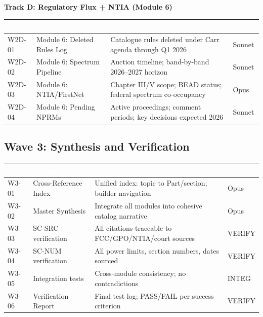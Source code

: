 \documentclass[11pt,letterpaper]{article}
\newcommand{\tableheader}[1]{\textbf{\sffamily\textcolor{white}{#1}}}
\begin{document}
\textbf{Track D: Regulatory Flux + NTIA (Module 6)}

\begin{center}
\begin{tabularx}{\textwidth}{C{1.5cm}L{3.5cm}XC{1.5cm}}
\toprule
{}
\tableheader{Task} & \tableheader{Component} & \tableheader{Description} & \tableheader{Model} \\
\midrule
W2D-01 & Module 6: Deleted Rules Log & Catalogue rules deleted under Carr agenda through Q1 2026 & Sonnet \\
W2D-02 & Module 6: Spectrum Pipeline & Auction timeline; band-by-band 2026--2027 horizon & Sonnet \\
W2D-03 & Module 6: NTIA/FirstNet & Chapter III/V scope; BEAD status; federal spectrum co-occupancy & Opus \\
W2D-04 & Module 6: Pending NPRMs & Active proceedings; comment periods; key decisions expected 2026 & Sonnet \\
\bottomrule
\end{tabularx}
\end{center}

\subsection{Wave 3: Synthesis and Verification}

\begin{center}
\begin{tabularx}{\textwidth}{C{1.5cm}L{4cm}XC{1.5cm}}
\toprule
{}
\tableheader{Task} & \tableheader{Component} & \tableheader{Description} & \tableheader{Model} \\
\midrule
W3-01 & Cross-Reference Index & Unified index: topic to Part/section; builder navigation & Opus \\
W3-02 & Master Synthesis & Integrate all modules into cohesive catalog narrative & Opus \\
W3-03 & SC-SRC verification & All citations traceable to FCC/GPO/NTIA/court sources & VERIFY \\
W3-04 & SC-NUM verification & All power limits, section numbers, dates sourced & VERIFY \\
W3-05 & Integration tests & Cross-module consistency; no contradictions & INTEG \\
W3-06 & Verification Report & Final test log; PASS/FAIL per success criterion & VERIFY \\
\bottomrule
\end{tabularx}
\end{center}
\end{document}
